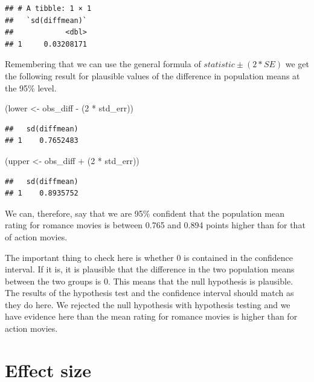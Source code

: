 \documentclass[]{tufte-book}
\newenvironment{Shaded}{\begin{snugshade}}{\end{snugshade}}
\newcommand{\DecValTok}[1]{\textcolor[rgb]{0.00,0.00,0.81}{{#1}}}
\newcommand{\StringTok}[1]{\textcolor[rgb]{0.31,0.60,0.02}{{#1}}}
\newcommand{\NormalTok}[1]{{#1}}
\begin{document}
\begin{verbatim}
## # A tibble: 1 × 1
##   `sd(diffmean)`
##            <dbl>
## 1     0.03208171
\end{verbatim}

Remembering that we can use the general formula of
\(statistic \pm (2 * SE)\) we get the following result for plausible
values of the difference in population means at the 95\% level.

\begin{Shaded}
\begin{Highlighting}[]
\NormalTok{(lower <-}\StringTok{ }\NormalTok{obs_diff -}\StringTok{ }\NormalTok{(}\DecValTok{2} \NormalTok{*}\StringTok{ }\NormalTok{std_err))}
\end{Highlighting}
\end{Shaded}

\begin{verbatim}
##   sd(diffmean)
## 1    0.7652483
\end{verbatim}

\begin{Shaded}
\begin{Highlighting}[]
\NormalTok{(upper <-}\StringTok{ }\NormalTok{obs_diff +}\StringTok{ }\NormalTok{(}\DecValTok{2} \NormalTok{*}\StringTok{ }\NormalTok{std_err))}
\end{Highlighting}
\end{Shaded}

\begin{verbatim}
##   sd(diffmean)
## 1    0.8935752
\end{verbatim}

We can, therefore, say that we are 95\% confident that the population
mean rating for romance movies is between 0.765 and 0.894 points higher
than for that of action movies.

The important thing to check here is whether 0 is contained in the
confidence interval. If it is, it is plausible that the difference in
the two population means between the two groups is 0. This means that
the null hypothesis is plausible. The results of the hypothesis test and
the confidence interval should match as they do here. We rejected the
null hypothesis with hypothesis testing and we have evidence here than
the mean rating for romance movies is higher than for action movies.

\section{Effect size}\label{effect-size}
\end{document}
